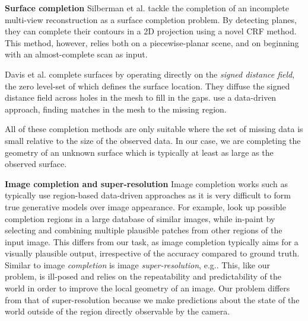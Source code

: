 \documentclass[10pt,twocolumn,letterpaper]{article}
\makeatletter
\renewcommand*{\eg}{e.g.\@\xspace}
\newcommand*{\ea}{et al.\@\xspace}
\renewcommand{\paragraph}{\vspace{2pt}\noindent\textbf}
\makeatother
\begin{document}
\paragraph{Surface completion}
Silberman \ea \cite{silberman-eccv-2014} tackle the completion of an incomplete multi-view reconstruction as a surface completion problem.
By detecting planes, they can complete their contours in a 2D projection using a novel CRF method.
This method, however, relies both on a piecewise-planar scene, and on beginning with an almost-complete scan as input.

Davis \ea \cite{davis-3dpvt-2002} complete surfaces by operating directly on the \emph{signed distance field}, the zero level-set of which defines the surface location. They diffuse the signed distance field across holes in the mesh to fill in the gaps.
\cite{harary-tog-2013} use a data-driven approach, finding matches in the mesh to the missing region.

All of these completion methods are only suitable where the set of missing data is small relative to the size of the observed data.
In our case, we are completing the geometry of an unknown surface which is typically at least as large as the observed surface.


\paragraph{Image completion and super-resolution}
Image completion works such as \cite{hays-siggraph-2007, criminisi-cvpr-2003}
typically use region-based data-driven approaches as it is very difficult to form true generative models over image appearance.
For example, \cite{hays-siggraph-2007} look up possible completion regions in a large database of similar images, while \cite{criminisi-cvpr-2003} in-paint by selecting and combining multiple plausible patches from other regions of the input image.
This differs from our task, as image completion typically aims for a visually plausible output, irrespective of the accuracy compared to ground truth.
Similar to image \emph{completion} is image \emph{super-resolution}, \eg \cite{macaodha-eccv-2012}.
This, like our problem, is ill-posed and relies on the repeatability and predictability of the world in order to improve the local geometry of an image.
Our problem differs from that of super-resolution because we make predictions about the state of the world outside of the region directly observable by the camera.
\end{document}

